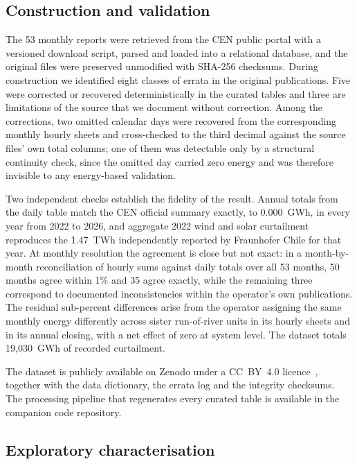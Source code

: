 \subsection{Construction and validation}

The 53 monthly reports were retrieved from the CEN public portal with a versioned download script, parsed and loaded into a relational database, and the original files were preserved unmodified with SHA-256 checksums. During construction we identified eight classes of errata in the original publications. Five were corrected or recovered deterministically in the curated tables and three are limitations of the source that we document without correction. Among the corrections, two omitted calendar days were recovered from the corresponding monthly hourly sheets and cross-checked to the third decimal against the source files' own total columns; one of them was detectable only by a structural continuity check, since the omitted day carried zero energy and was therefore invisible to any energy-based validation.

Two independent checks establish the fidelity of the result. Annual totals from the daily table match the CEN official summary exactly, to 0.000~GWh, in every year from 2022 to 2026, and aggregate 2022 wind and solar curtailment reproduces the 1.47~TWh independently reported by Fraunhofer Chile for that year. At monthly resolution the agreement is close but not exact: in a month-by-month reconciliation of hourly sums against daily totals over all 53 months, 50 months agree within 1\% and 35 agree exactly, while the remaining three correspond to documented inconsistencies within the operator's own publications. The residual sub-percent differences arise from the operator assigning the same monthly energy differently across sister run-of-river units in its hourly sheets and in its annual closing, with a net effect of zero at system level. The dataset totals 19{,}030~GWh of recorded curtailment.

The dataset is publicly available on Zenodo under a CC~BY~4.0 licence~\cite{dataset2026}, together with the data dictionary, the errata log and the integrity checksums. The processing pipeline that regenerates every curated table is available in the companion code repository.

\subsection{Exploratory characterisation}
\label{sec:eda}

